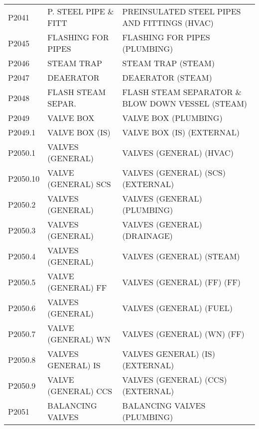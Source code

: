 \begin{longtable}[l]{l%
                  l|%
                  l|}
\rowcolor{thetableheadbgcolor!0.25!white} P2041       & P. STEEL PIPE \& FITT   & PREINSULATED STEEL PIPES AND FITTINGS (HVAC)   \\
\rowcolor{thetableheadbgcolor!0.25!white} P2045       & FLASHING FOR PIPES   & FLASHING FOR PIPES (PLUMBING)   \\
\rowcolor{thetableheadbgcolor!0.25!white} P2046       & STEAM TRAP   & STEAM TRAP (STEAM)   \\
\rowcolor{thetableheadbgcolor!0.25!white} P2047       & DEAERATOR   & DEAERATOR (STEAM)   \\
\rowcolor{thetableheadbgcolor!0.25!white} P2048       & FLASH STEAM SEPAR.   & FLASH STEAM SEPARATOR \& BLOW DOWN VESSEL (STEAM)   \\
\rowcolor{thetableheadbgcolor!0.25!white} P2049       & VALVE BOX   & VALVE BOX (PLUMBING)   \\
\rowcolor{thetableheadbgcolor!0.25!white} P2049.1     & VALVE BOX (IS)   & VALVE BOX (IS) (EXTERNAL)   \\
\rowcolor{thetableheadbgcolor!0.25!white} P2050.1     & VALVES (GENERAL)   & VALVES (GENERAL) (HVAC)   \\
\rowcolor{thetableheadbgcolor!0.25!white} P2050.10    & VALVE (GENERAL) SCS   & VALVES (GENERAL) (SCS) (EXTERNAL)   \\
\rowcolor{thetableheadbgcolor!0.25!white} P2050.2     & VALVES (GENERAL)   & VALVES (GENERAL) (PLUMBING)   \\
\rowcolor{thetableheadbgcolor!0.25!white} P2050.3     & VALVES (GENERAL)   & VALVES (GENERAL) (DRAINAGE)   \\
\rowcolor{thetableheadbgcolor!0.25!white} P2050.4     & VALVES (GENERAL)   & VALVES (GENERAL) (STEAM)   \\
\rowcolor{thetableheadbgcolor!0.25!white} P2050.5     & VALVE (GENERAL) FF   & VALVES (GENERAL) (FF) (FF)   \\
\rowcolor{thetableheadbgcolor!0.25!white} P2050.6     & VALVES (GENERAL)   & VALVES (GENERAL)  (FUEL)   \\
\rowcolor{thetableheadbgcolor!0.25!white} P2050.7     & VALVE (GENERAL) WN   & VALVES (GENERAL) (WN) (FF)   \\
\rowcolor{thetableheadbgcolor!0.25!white} P2050.8     & VALVES GENERAL) IS   & VALVES GENERAL) (IS) (EXTERNAL)   \\
\rowcolor{thetableheadbgcolor!0.25!white} P2050.9     & VALVE (GENERAL) CCS   & VALVES (GENERAL) (CCS) (EXTERNAL)   \\
\rowcolor{thetableheadbgcolor!0.25!white} P2051       & BALANCING VALVES   & BALANCING VALVES (PLUMBING)   \\

\end{longtable}
